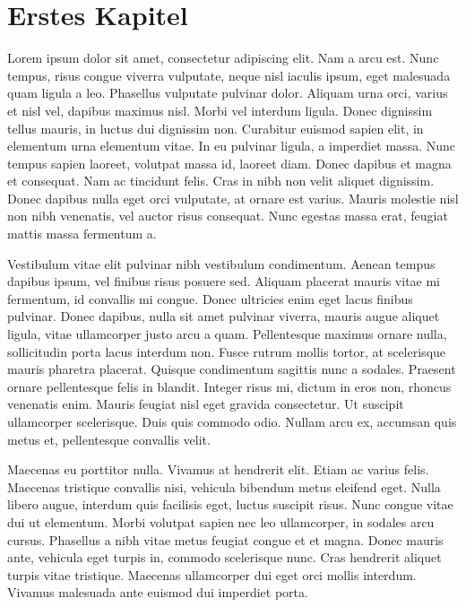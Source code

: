 \chapter{Erstes Kapitel}\label{chap:intro}

Lorem ipsum dolor sit amet, consectetur adipiscing elit. Nam a arcu est. Nunc tempus, risus congue viverra vulputate, neque nisl iaculis ipsum, eget malesuada quam ligula a leo. Phasellus vulputate pulvinar dolor. Aliquam urna orci, varius et nisl vel, dapibus maximus nisl. Morbi vel interdum ligula. Donec dignissim tellus mauris, in luctus dui dignissim non. Curabitur euismod sapien elit, in elementum urna elementum vitae. In eu pulvinar ligula, a imperdiet massa. Nunc tempus sapien laoreet, volutpat massa id, laoreet diam. Donec dapibus et magna et consequat. Nam ac tincidunt felis. Cras in nibh non velit aliquet dignissim. Donec dapibus nulla eget orci vulputate, at ornare est varius. Mauris molestie nisl non nibh venenatis, vel auctor risus consequat. Nunc egestas massa erat, feugiat mattis massa fermentum a.

Vestibulum vitae elit pulvinar nibh vestibulum condimentum. Aenean tempus dapibus ipsum, vel finibus risus posuere sed. Aliquam placerat mauris vitae mi fermentum, id convallis mi congue. Donec ultricies enim eget lacus finibus pulvinar. Donec dapibus, nulla sit amet pulvinar viverra, mauris augue aliquet ligula, vitae ullamcorper justo arcu a quam. Pellentesque maximus ornare nulla, sollicitudin porta lacus interdum non. Fusce rutrum mollis tortor, at scelerisque mauris pharetra placerat. Quisque condimentum sagittis nunc a sodales. Praesent ornare pellentesque felis in blandit. Integer risus mi, dictum in eros non, rhoncus venenatis enim. Mauris feugiat nisl eget gravida consectetur. Ut suscipit ullamcorper scelerisque. Duis quis commodo odio. Nullam arcu ex, accumsan quis metus et, pellentesque convallis velit.

Maecenas eu porttitor nulla. Vivamus at hendrerit elit. Etiam ac varius felis. Maecenas tristique convallis nisi, vehicula bibendum metus eleifend eget. Nulla libero augue, interdum quis facilisis eget, luctus suscipit risus. Nunc congue vitae dui ut elementum. Morbi volutpat sapien nec leo ullamcorper, in sodales arcu cursus. Phasellus a nibh vitae metus feugiat congue et et magna. Donec mauris ante, vehicula eget turpis in, commodo scelerisque nunc. Cras hendrerit aliquet turpis vitae tristique. Maecenas ullamcorper dui eget orci mollis interdum. Vivamus malesuada ante euismod dui imperdiet porta.

